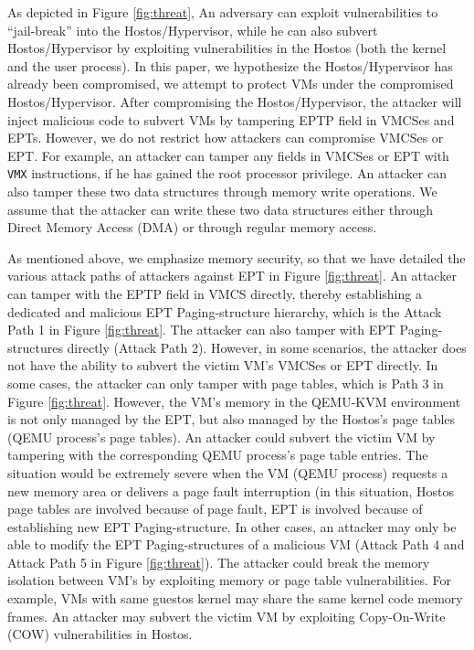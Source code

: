 As depicted in Figure \ref{fig:threat}, 
An adversary can exploit vulnerabilities to ``jail-break'' into the Hostos/Hypervisor, while he can also subvert Hostos/Hypervisor by exploiting vulnerabilities in the Hostos (both the kernel and the user process).
In this paper, we hypothesize the Hostos/Hypervisor has already been compromised, we attempt to protect VMs under the compromised Hostos/Hypervisor. 
After compromising the Hostos/Hypervisor, the attacker will inject malicious code to subvert VMs by tampering EPTP field in VMCSes and EPTs.
However, we do not restrict how attackers can compromise VMCSes or EPT. 
For example, an attacker can tamper any fields in VMCSes or EPT with \verb|VMX| instructions, if he has gained the root processor privilege. An attacker can also tamper these two data structures through memory write operations. We assume that the attacker can write these two data structures either through Direct Memory Access (DMA) or through regular memory access. 

As mentioned above, we emphasize memory security, so that we have detailed the various attack paths of attackers against EPT in Figure \ref{fig:threat}.
An attacker can tamper with the EPTP field in VMCS directly, thereby establishing a dedicated and malicious EPT Paging-structure hierarchy, which is the Attack Path 1 in Figure \ref{fig:threat}. 
The attacker can also tamper with EPT Paging-structures directly (Attack Path 2).
However, in some scenarios, the attacker does not have the ability to subvert the victim VM's VMCSes or EPT directly. 
In some cases, the attacker can only tamper with page tables, which is Path 3 in Figure \ref{fig:threat}. However, the VM's memory in the QEMU-KVM environment is not only managed by the EPT, but also managed by the Hostos's page tables (QEMU process's page tables). An attacker could subvert the victim VM by tampering with the corresponding QEMU process's page table entries. The situation would be extremely severe when the VM (QEMU process) requests a new memory area or delivers a page fault interruption (in this situation, Hostos page tables are involved because of page fault, EPT is involved because of establishing new EPT Paging-structure. 
In other cases,  
an attacker may only be able to modify the EPT Paging-structures of a malicious VM (Attack Path 4 and Attack Path 5 in Figure \ref{fig:threat}). 
The attacker could break the memory isolation between VM's by exploiting memory or page table vulnerabilities. For example, VMs with same guestos kernel may share the same kernel code memory frames. An attacker may subvert the victim VM by exploiting Copy-On-Write (COW) vulnerabilities in Hostos. 

